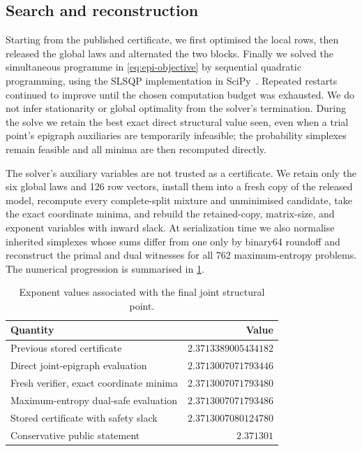 \documentclass[11pt,reqno]{amsart}
\theoremstyle{definition}
\theoremstyle{remark}
\begin{document}
\subsection{Search and reconstruction}

Starting from the published certificate, we first optimised the local rows, then released the global laws
and alternated the two blocks.  Finally we solved the simultaneous programme in
\cref{eq:epi-objective} by sequential quadratic programming, using the SLSQP implementation in
SciPy~\cite{Kraft1988,SciPy2020}.  Repeated restarts continued to improve until the chosen computation
budget was exhausted.  We do not infer stationarity or global optimality from the solver's termination.
During the solve we retain the best exact direct structural value seen, even when a trial point's epigraph
auxiliaries are temporarily infeasible; the probability simplexes remain feasible and all minima are then
recomputed directly.

The solver's auxiliary variables are not trusted as a certificate.  We retain only the six global laws and
126 row vectors, install them into a fresh copy of the released model, recompute every complete-split
mixture and unminimised candidate, take the exact coordinate minima, and rebuild the retained-copy,
matrix-size, and exponent variables with inward slack.  At serialization time we also normalise inherited
simplexes whose sums differ from one only by binary64 roundoff and reconstruct the primal and dual
witnesses for all 762 maximum-entropy problems.  The numerical progression is summarised in
\cref{tab:values}.

\begin{table}[t]
  \centering
  \caption{Exponent values associated with the final joint structural point.}
  \label{tab:values}
  \begin{tabular}{@{}lr@{}}
    \toprule
    Quantity & Value \\
    \midrule
    Previous stored certificate & $2.3713389005434182$ \\
    Direct joint-epigraph evaluation & $2.3713007071793446$ \\
    Fresh verifier, exact coordinate minima & $2.3713007071793480$ \\
    Maximum-entropy dual-safe evaluation & $2.3713007071793486$ \\
    Stored certificate with safety slack & $2.3713007080124780$ \\
    Conservative public statement & $2.371301$ \\
    \bottomrule
  \end{tabular}
\end{table}
\end{document}
